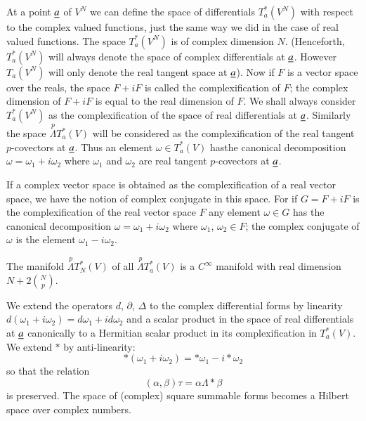 At a point $\underline{a}$ of $V^{N}$ we can define the space of
differentials $T^{\ast}_{a}(V^{N})$ with respect to the complex valued
functions, just the same way we did in the case of real valued
functions. The space $T^{\ast}_{a}(V^{N})$ is of complex dimension
$N$. (Henceforth, $T^{\ast}_{a}(V^{N})$ will always denote the space
of complex differentials at $\underline{a}$. However $T_{a}(V^{N})$ will only
denote the real tangent space at $\underline{a}$). Now if $F$ is a vector
space over the reals, the space $F+iF$ is called the complexification
of $F$; the complex dimension of $F+iF$ is equal to the real dimension
of $F$. We shall always consider $T^{\ast}_{a}(V^{N})$ as the
complexification of the space of real differentials at
$\underline{a}$. Similarly the space $\overset{p}{\Lambda}T^{\ast}_{a}(V)$
will be considered as the complexification of the real tangent
$p$-covectors at $\underline{a}$. Thus an element $\omega\in T^*_{a}(V)$ 
has\pageoriginale the canonical decomposition
$\omega=\omega_{1}+i\omega_{2}$ where $\omega_{1}$ and $\omega_{2}$
are real tangent $p$-covectors at $\underline{a}$.

If a complex vector space is obtained as the complexification of a
real vector space, we have the notion of complex conjugate in this
space. For if $G=F+iF$ is the complexification of the real vector
space $F$ any element $\omega\in G$ has the canonical decomposition
$\omega=\omega_{1}+i\omega_{2}$ where $\omega_{1}$, $\omega_{2}\in F$;
the complex conjugate of $\omega$ is the element
$\omega_{1}-i\omega_{2}$.

The manifold $\overset{p}{\Lambda}T^{\ast}_{N}(V)$ of all
$\overset{p}{\Lambda}T^{\ast}_{a}(V)$ is a $C^{\infty}$ manifold with
real dimension $N+2\binom{N}{p}$.

We extend the operators $d$, $\partial$, $\Delta$ to the complex
differential forms by linearity
$d(\omega_{1}+i\omega_{2})=d\omega_{1}+id\omega_{2}$ and a scalar
product in the space of real differentials at $\underline{a}$ canonically to
a Hermitian scalar product in its complexification \iec in
$T^{\ast}_{a}(V)$. We extend $\ast$ by anti-linearity:
$$
\ast(\omega_{1}+i\omega_{2})=\ast\omega_{1}-i\ast\omega_{2}
$$
so that the relation
$$
(\alpha,\beta)\tau=\alpha\Lambda\ast\beta
$$
is preserved. The space of (complex) square summable forms becomes a
Hilbert space over complex numbers.


